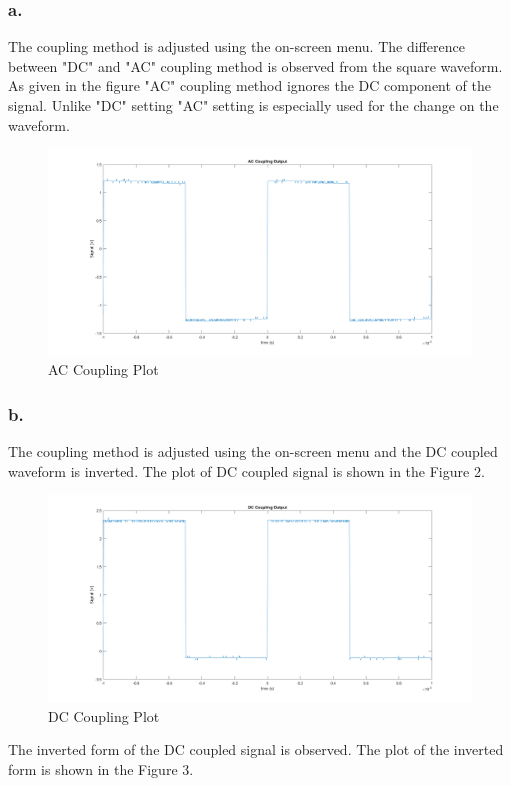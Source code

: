 \documentclass[letterpaper,12pt]{article}
\begin{document}
\subsubsection{a.}
The coupling method is adjusted using the on-screen menu. The difference between "DC" and "AC" coupling method is observed from the square waveform. As given in the figure "AC" coupling method ignores the DC component of the signal. Unlike "DC" setting "AC" setting is especially used for the change on the waveform.
\begin{figure}[!ht]
	\caption{AC Coupling Plot}
	\centering
	\includegraphics[width=1\textwidth]{2a.png}
\end{figure}

\subsubsection{b.}
The coupling method is adjusted using the on-screen menu and the DC coupled waveform is inverted. The plot of DC coupled signal is shown in the Figure 2.

\begin{figure}[!ht]
	\caption{DC Coupling Plot}
	\centering
	\includegraphics[width=1\textwidth]{2b1.png}
\end{figure}
The inverted form of the DC coupled signal is observed. The plot of the inverted form is shown in the Figure 3.
\end{document}
